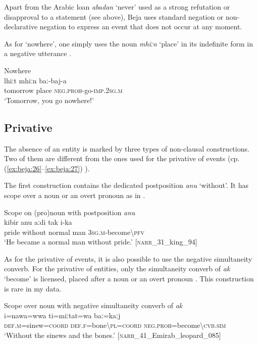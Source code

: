 \documentclass[output=paper,colorlinks,citecolor=brown]{langscibook}
\begin{document}
Apart from the Arabic loan \textit{abadan} ‘never’ used as a strong refutation or disapproval to a statement (see  above), Beja uses standard negation or non-declarative negation to express an event that does not occur at any moment.

As for ‘nowhere’, one simply uses the noun \textit{mhiːn} ‘place’ in its indefinite form in a negative utterance .

\ea\label{ex:beja:37}
{Nowhere}\\
    \gll lhiːt mhiːn baː-baj-a\\
         tomorrow place \textsc{neg.proh}-go-\textsc{imp.2sg.m}\\
    \glt `Tomorrow, you go nowhere!'
\z

\subsection{Privative}

The absence of an entity is marked by three types of non-clausal constructions. Two of them are different from the ones used for the privative of events (cp. (\ref{ex:beja:26}--\ref{ex:beja:27}) ).

The first construction contains the dedicated postposition \textit{anu} ‘without’. It has scope over a noun or an overt pronoun as in .

\ea\label{ex:beja:38}
{Scope on (pro)noun with postposition \textit{anu}}\\
    \gll kibir anu aːdi tak i-ka\\
         pride without normal man \textsc{3sg.m-}become{\textbackslash}\textsc{pfv}\\
    \glt `He became a normal man without pride.' [\textsc{narr}\_31\_king\_94]
\z

As for the privative of events, it is also possible to use the negative simultaneity converb. For the privative of entities, only the simultaneity converb of \textit{ak} ‘become’ is licensed, placed after a noun or an overt pronoun . This construction is rare in my data.


\ea\label{ex:beja:39}
{Scope over noun with negative simultaneity converb of \textit{ak}} \\
    \gll i=nawa=wwa ti=miːtat=wa baː=kaːj\\
         \textsc{def.m}=sinew=\textsc{coord} \textsc{def.f}=bone{\textbackslash}\textsc{pl=coord} \textsc{neg.proh}=become{\textbackslash}\textsc{cvb.sim}\\
    \glt `Without the sinews and the bones.' [\textsc{narr}\_41\_Emirab\_leopard\_085] 
\z
\end{document}
